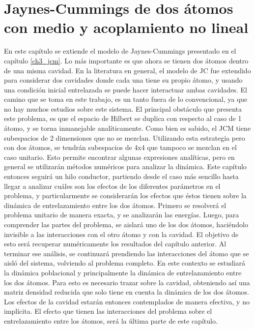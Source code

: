 \chapter{Jaynes-Cummings de dos átomos con medio y acoplamiento no lineal}
\label{ch4_dinamica}

\pagestyle{fancy}
\fancyhf{}
\fancyhead[LE]{\nouppercase{\rightmark\hfill}}
\fancyhead[RO]{\nouppercase{\leftmark\hfill}}
\fancyfoot[LE,RO]{\hfill\thepage\hfill}

En este capítulo se extiende el modelo de Jaynes-Cummings presentado en el capítulo \ref{ch3_jcm}. Lo más importante es que ahora se tienen dos átomos dentro de una misma cavidad. En la literatura en general, el modelo de JC fue extendido para considerar dos cavidades donde cada una tiene su propio átomo, y usando una condición inicial entrelazada se puede hacer interactuar ambas cavidades. El camino que se toma en este trabajo, es un tanto fuera de lo convencional, ya que no hay muchos estudios sobre este sistema. El principal obstáculo que presenta este problema, es que el espacio de Hilbert se duplica con respecto al caso de 1 átomo, y se torna inmanejable analíticamente. Como bien es sabido, el JCM tiene subespacios de 2 dimensiones que no se mezclan. Utilizando esta estrategia pero con dos átomos, se tendrán subespacios de 4x4 que tampoco se mezclan en el caso unitario. Esto permite encontrar algunas expresiones analíticas, pero en general se utilizarán métodos numéricos para analizar la dinámica. \newline
Este capítulo entonces seguirá un hilo conductor, partiendo desde el caso más sencillo hasta llegar a analizar cuáles son los efectos de los diferentes parámetros en el problema, y particularmente se considerarán los efectos que éstos tienen sobre la dinámica de entrelazamiento entre los dos átomos. 
Primero se resolverá el problema unitario de manera exacta, y se analizarán las energías. Luego, para comprender las partes del problema, se aislará uno de los dos átomos, haciéndolo invisible a las interacciones con el otro átomo y con la cavidad. El objetivo de esto será recuperar numéricamente los resultados del capítulo anterior. Al terminar ese análisis, se continuará prendiendo las interacciones del átomo que se aisló del sistema, volviendo al problema completo. En este contexto se estudiará la dinámica poblacional y principalmente la dinámica de entrelazamiento entre los dos átomos. Para esto es necesario trazar sobre la cavidad, obteniendo así una matriz densidad reducida que solo tiene en cuenta la dinámica de los dos átomos. Los efectos de la cavidad estarán entonces contemplados de manera efectiva, y no implícita. El efecto que tienen las interacciones del problema sobre el entrelazamiento entre los átomos, será la última parte de este capítulo.
